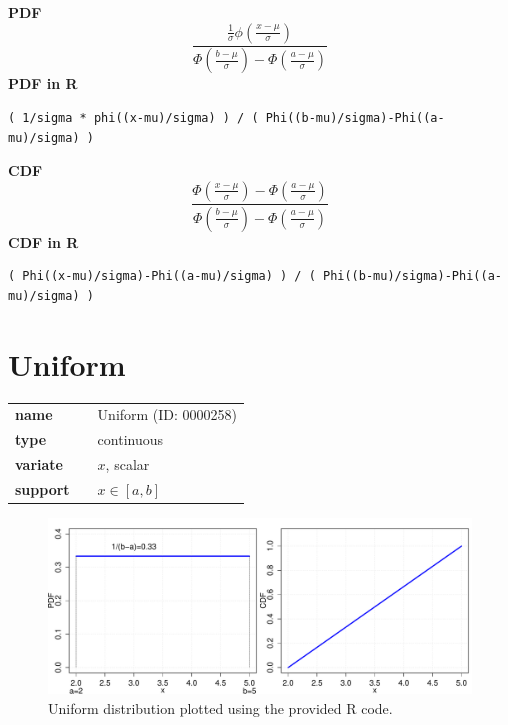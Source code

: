 \documentclass{article}
\begin{document}
\smallskip \noindent \hspace{.2cm} \textbf{PDF} 
\begin{equation*}\frac{\frac{1}{\sigma} \phi(\frac{x-\mu}{\sigma})}{\Phi(\frac{b-\mu}{\sigma})-\Phi(\frac{a-\mu}{\sigma})}\end{equation*}
\smallskip \noindent \hspace{.2cm} \textbf{PDF in R}  
\begin{verbatim}( 1/sigma * phi((x-mu)/sigma) ) / ( Phi((b-mu)/sigma)-Phi((a-mu)/sigma) )\end{verbatim}
\smallskip \noindent \hspace{.2cm} \textbf{CDF} 
\begin{equation*}\frac{\Phi(\frac{x-\mu}{\sigma})-\Phi(\frac{a-\mu}{\sigma})}{\Phi(\frac{b-\mu}{\sigma})-\Phi(\frac{a-\mu}{\sigma})}\end{equation*}
\smallskip \noindent \hspace{.2cm} \textbf{CDF in R} 
\begin{verbatim}( Phi((x-mu)/sigma)-Phi((a-mu)/sigma) ) / ( Phi((b-mu)/sigma)-Phi((a-mu)/sigma) )\end{verbatim}
\smallskip\section*{Uniform} 

  \bigskip 

\begin{tabular}{p{2cm}cl}
\textbf{name} & & Uniform (ID: 0000258)\\ 
 
\textbf{type} & & continuous \\ 

\textbf{variate} & & $x$, scalar \\ 

\textbf{support} & & $x \in [a,b]$
\end{tabular}

\begin{figure}[ht!]
\centering
  \includegraphics[width=140mm]{pics/Uniform.pdf}
 \caption{Uniform distribution plotted using the provided R code.}
 \label{fig:Uniform}
\end{figure}
\end{document}
